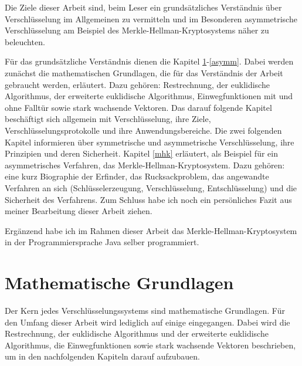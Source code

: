 \documentclass[a4paper,12pt,titlepage]{article}
\begin{document}
Die Ziele dieser Arbeit sind, beim Leser ein grundsätzliches Verständnis über Verschlüsselung im Allgemeinen zu vermitteln und im Besonderen asymmetrische Verschlüsselung am Beispiel des Merkle-Hellman-Kryptosystems näher zu beleuchten.

Für das grundsätzliche Verständnis dienen die Kapitel \ref{math}-\ref{asymm}. Dabei werden zunächst die mathematischen Grundlagen, die für das Verständnis der Arbeit gebraucht werden, erläutert. Dazu gehören: Restrechnung, der euklidische Algorithmus, der erweiterte euklidische Algorithmus, Einwegfunktionen mit und ohne Falltür sowie stark wachsende Vektoren. Das darauf folgende Kapitel beschäftigt sich allgemein mit Verschlüsselung, ihre Ziele, Verschlüsselungsprotokolle und ihre Anwendungsbereiche. Die zwei folgenden Kapitel informieren über symmetrische und asymmetrische Verschlüsselung, ihre Prinzipien und deren Sicherheit. Kapitel \ref{mhk} erläutert, als Beispiel für ein asymmetrisches Verfahren, das Merkle-Hellman-Kryptosystem. Dazu gehören: eine kurz Biographie der Erfinder, das Rucksackproblem, das angewandte Verfahren an sich (Schlüsselerzeugung, Verschlüsselung, Entschlüsselung) und die Sicherheit des Verfahrens. Zum Schluss habe ich noch ein persönliches Fazit aus meiner
Bearbeitung dieser Arbeit ziehen.

Ergänzend habe ich im Rahmen dieser Arbeit
das Merkle-Hellman-Kryptosystem in der Programmiersprache Java selber
programmiert.  \newpage

\section{Mathematische Grundlagen}\label{math}
Der Kern jedes Verschlüsselungssystems sind mathematische Grundlagen. Für den Umfang dieser Arbeit wird lediglich auf einige eingegangen. Dabei wird die Restrechnung, der euklidische Algorithmus und der erweiterte euklidische Algorithmus, die Einwegfunktionen sowie stark wachsende Vektoren beschrieben, um in den nachfolgenden Kapiteln darauf aufzubauen.
\end{document}
